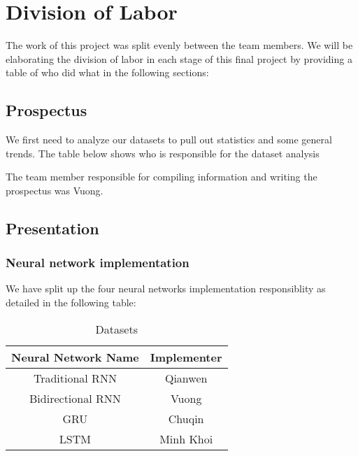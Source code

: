 \documentclass[letterpaper, 10 pt, conference]{ieeeconf}  %
\begin{document}
\section{Division of Labor}
    The work of this project was split evenly between the team members. We will be elaborating the division of labor in each stage of this final project by providing a table of who did what in the following sections:

    \subsection{Prospectus}
        We first need to analyze our datasets to pull out statistics and some general trends. The table below shows who is responsible for the dataset analysis

    
        The team member responsible for compiling information and writing the prospectus was Vuong.

    \subsection{Presentation}
        \subsubsection{Neural network implementation} We have split up the four neural networks implementation responsiblity as detailed in the following table:
            \begin{table}[h!] \centering
                \caption{Datasets}
                \begin{threeparttable}
                    \begin{tabular}{|c|c|}
                        \hline
                        Neural Network Name & Implementer\\
                        \hline
                        Traditional RNN & Qianwen\\
                        Bidirectional RNN & Vuong\\
                        GRU & Chuqin\\
                        LSTM & Minh Khoi\\
                        \hline
                    \end{tabular}
                \end{threeparttable}
            \end{table}
\end{document}
